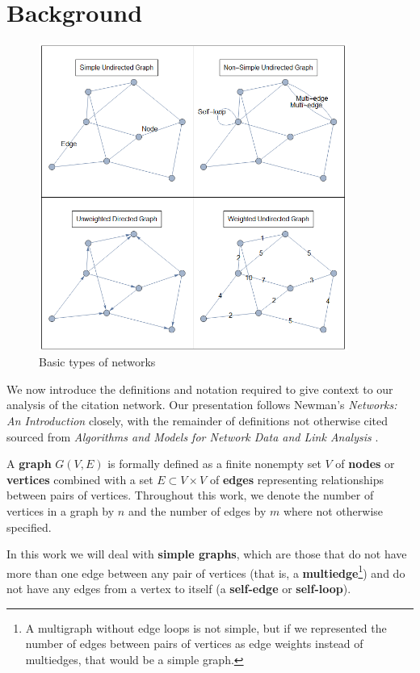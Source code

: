 \documentclass[12pt]{thesis}
\theoremstyle{plain}
\theoremstyle{definition}
\theoremstyle{remark}
\begin{document}
\section{Background}

\begin{figure}[t]
\centering
\includegraphics[width=0.9\textwidth]{basic_properties_demo.png}
\caption{Basic types of networks}
\label{fig:basic_properties_demo}
\end{figure}

We now introduce the definitions and notation required to give context to our analysis of the citation network. Our presentation follows Newman's \textit{Networks: An Introduction} \cite{newman2010} closely, with the remainder of definitions not otherwise cited sourced from \textit{Algorithms and Models for Network Data and Link Analysis} \cite{fouss2016}.

A \textbf{graph} $G(V,E)$ is formally defined as a finite nonempty set $V$ of \textbf{nodes} or \textbf{vertices} combined with a set $E\subset V\times V$ of \textbf{edges} representing relationships between pairs of vertices. Throughout this work, we denote the number of vertices in a graph by $n$ and the number of edges by $m$ where not otherwise specified.

In this work we will deal with \textbf{simple graphs}, which are those that do not have more than one edge between any pair of vertices (that is, a \textbf{multiedge}\footnote{A multigraph without edge loops is not simple, but if we represented the number of edges between pairs of vertices as edge weights instead of multiedges, that would be a simple graph.}) and do not have any edges from a vertex to itself (a \textbf{self-edge} or \textbf{self-loop}). 
\end{document}
